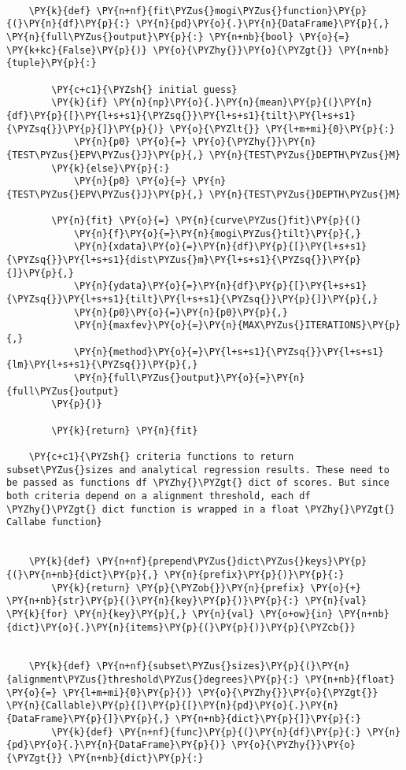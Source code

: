 \begin{tcolorbox}[breakable, size=fbox, boxrule=1pt, pad at break*=1mm,colback=cellbackground, colframe=cellborder]
\begin{Verbatim}[commandchars=\\\{\}]
    
    \PY{k}{def} \PY{n+nf}{fit\PYZus{}mogi\PYZus{}function}\PY{p}{(}\PY{n}{df}\PY{p}{:} \PY{n}{pd}\PY{o}{.}\PY{n}{DataFrame}\PY{p}{,} \PY{n}{full\PYZus{}output}\PY{p}{:} \PY{n+nb}{bool} \PY{o}{=} \PY{k+kc}{False}\PY{p}{)} \PY{o}{\PYZhy{}}\PY{o}{\PYZgt{}} \PY{n+nb}{tuple}\PY{p}{:}
    
        \PY{c+c1}{\PYZsh{} initial guess}
        \PY{k}{if} \PY{n}{np}\PY{o}{.}\PY{n}{mean}\PY{p}{(}\PY{n}{df}\PY{p}{[}\PY{l+s+s1}{\PYZsq{}}\PY{l+s+s1}{tilt}\PY{l+s+s1}{\PYZsq{}}\PY{p}{]}\PY{p}{)} \PY{o}{\PYZlt{}} \PY{l+m+mi}{0}\PY{p}{:}
            \PY{n}{p0} \PY{o}{=} \PY{o}{\PYZhy{}}\PY{n}{TEST\PYZus{}EPV\PYZus{}J}\PY{p}{,} \PY{n}{TEST\PYZus{}DEPTH\PYZus{}M}
        \PY{k}{else}\PY{p}{:}
            \PY{n}{p0} \PY{o}{=} \PY{n}{TEST\PYZus{}EPV\PYZus{}J}\PY{p}{,} \PY{n}{TEST\PYZus{}DEPTH\PYZus{}M}
    
        \PY{n}{fit} \PY{o}{=} \PY{n}{curve\PYZus{}fit}\PY{p}{(}
            \PY{n}{f}\PY{o}{=}\PY{n}{mogi\PYZus{}tilt}\PY{p}{,}
            \PY{n}{xdata}\PY{o}{=}\PY{n}{df}\PY{p}{[}\PY{l+s+s1}{\PYZsq{}}\PY{l+s+s1}{dist\PYZus{}m}\PY{l+s+s1}{\PYZsq{}}\PY{p}{]}\PY{p}{,}
            \PY{n}{ydata}\PY{o}{=}\PY{n}{df}\PY{p}{[}\PY{l+s+s1}{\PYZsq{}}\PY{l+s+s1}{tilt}\PY{l+s+s1}{\PYZsq{}}\PY{p}{]}\PY{p}{,}
            \PY{n}{p0}\PY{o}{=}\PY{n}{p0}\PY{p}{,}
            \PY{n}{maxfev}\PY{o}{=}\PY{n}{MAX\PYZus{}ITERATIONS}\PY{p}{,}
            \PY{n}{method}\PY{o}{=}\PY{l+s+s1}{\PYZsq{}}\PY{l+s+s1}{lm}\PY{l+s+s1}{\PYZsq{}}\PY{p}{,}
            \PY{n}{full\PYZus{}output}\PY{o}{=}\PY{n}{full\PYZus{}output}
        \PY{p}{)}
    
        \PY{k}{return} \PY{n}{fit}
    
    \PY{c+c1}{\PYZsh{} criteria functions to return subset\PYZus{}sizes and analytical regression results. These need to be passed as functions df \PYZhy{}\PYZgt{} dict of scores. But since both criteria depend on a alignment threshold, each df \PYZhy{}\PYZgt{} dict function is wrapped in a float \PYZhy{}\PYZgt{} Callabe function}
    
    
    \PY{k}{def} \PY{n+nf}{prepend\PYZus{}dict\PYZus{}keys}\PY{p}{(}\PY{n+nb}{dict}\PY{p}{,} \PY{n}{prefix}\PY{p}{)}\PY{p}{:}
        \PY{k}{return} \PY{p}{\PYZob{}}\PY{n}{prefix} \PY{o}{+} \PY{n+nb}{str}\PY{p}{(}\PY{n}{key}\PY{p}{)}\PY{p}{:} \PY{n}{val} \PY{k}{for} \PY{n}{key}\PY{p}{,} \PY{n}{val} \PY{o+ow}{in} \PY{n+nb}{dict}\PY{o}{.}\PY{n}{items}\PY{p}{(}\PY{p}{)}\PY{p}{\PYZcb{}}
    
    
    \PY{k}{def} \PY{n+nf}{subset\PYZus{}sizes}\PY{p}{(}\PY{n}{alignment\PYZus{}threshold\PYZus{}degrees}\PY{p}{:} \PY{n+nb}{float} \PY{o}{=} \PY{l+m+mi}{0}\PY{p}{)} \PY{o}{\PYZhy{}}\PY{o}{\PYZgt{}} \PY{n}{Callable}\PY{p}{[}\PY{p}{[}\PY{n}{pd}\PY{o}{.}\PY{n}{DataFrame}\PY{p}{]}\PY{p}{,} \PY{n+nb}{dict}\PY{p}{]}\PY{p}{:}
        \PY{k}{def} \PY{n+nf}{func}\PY{p}{(}\PY{n}{df}\PY{p}{:} \PY{n}{pd}\PY{o}{.}\PY{n}{DataFrame}\PY{p}{)} \PY{o}{\PYZhy{}}\PY{o}{\PYZgt{}} \PY{n+nb}{dict}\PY{p}{:}
    

\end{Verbatim}
\end{tcolorbox}
